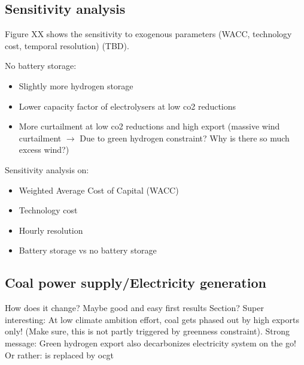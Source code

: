 \subsection{Sensitivity analysis}
\label{subsec:sensitivity}
Figure XX shows the sensitivity to exogenous parameters (WACC, technology cost, temporal resolution) (TBD).

No battery storage:
\begin{itemize}
    \item Slightly more hydrogen storage
    \item Lower capacity factor of electrolysers at low co2 reductions
    \item More curtailment at low co2 reductions and high export (massive wind curtailment $\rightarrow$ Due to green hydrogen constraint? Why is there so much excess wind?)
\end{itemize}

Sensitivity analysis on:
\begin{itemize}
    \item Weighted Average Cost of Capital (WACC)
    \item Technology cost
    \item Hourly resolution
    \item Battery storage vs no battery storage
\end{itemize}

\subsection{Coal power supply/Electricity generation}
How does it change? Maybe good and easy first results Section?
Super interesting: At low climate ambition effort, coal gets phased out by high exports only! (Make sure, this is not partly triggered by greenness constraint). Strong message: Green hydrogen export also decarbonizes electricity system on the go! Or rather: is replaced by ocgt

